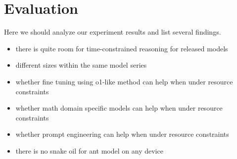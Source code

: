 \section{Evaluation}
Here we should analyze our experiment results and list several findings.

\begin{itemize}
    \item there is quite room for time-constrained reasoning for released models
    \item different sizes within the same model series
    \item whether fine tuning using o1-like method can help when under resource constraints
    \item whether math domain specific models can help when under resource constraints
    \item whether prompt engineering can help when under resource constraints
    \item there is no snake oil for ant model on any device
\end{itemize}

